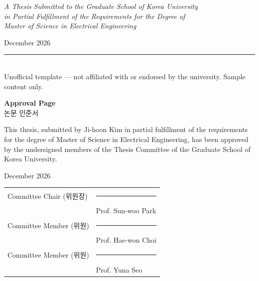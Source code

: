 \documentclass[12pt,a4paper]{report}
\begin{document}
\begin{titlepage}
\vspace{1.2cm}
{\normalsize\itshape A Thesis Submitted to the Graduate School of Korea University\\
in Partial Fulfillment of the Requirements for the Degree of\\
Master of Science in Electrical Engineering}

\vfill

{\color{kugray}\normalsize December 2026}

\vspace{0.6cm}
\rule{5cm}{0.4pt}\\[4pt]
{\footnotesize\color{kugray} Unofficial template --- not affiliated with or endorsed by the university. Sample content only.}

\vspace{1.2cm}
\restoregeometry
\end{titlepage}

\setcounter{page}{2}

\thispagestyle{empty}
\begin{center}
\vspace*{1.2cm}
{\Large\bfseries\color{kucrimson} Approval Page}\\[3pt]
{\normalsize\color{kugray} 논문 인준서}
\end{center}

\kudivider
\vspace{0.6cm}

\noindent This thesis, submitted by Ji-hoon Kim in partial fulfillment of the requirements
for the degree of Master of Science in Electrical Engineering, has been approved by the
undersigned members of the Thesis Committee of the Graduate School of Korea University.

\vspace{0.3cm}

\vspace{1.2cm}
\noindent December 2026

\vspace{1.0cm}
\begin{center}
\begin{tabular}{@{}p{4.2cm}p{5.5cm}@{}}
Committee Chair (위원장) & \rule{5.5cm}{0.4pt} \\[2pt]
 & Prof. Sun-woo Park \\[18pt]
Committee Member (위원) & \rule{5.5cm}{0.4pt} \\[2pt]
 & Prof. Hae-won Choi \\[18pt]
Committee Member (위원) & \rule{5.5cm}{0.4pt} \\[2pt]
 & Prof. Yuna Seo \\
\end{tabular}
\end{center}
\end{document}
